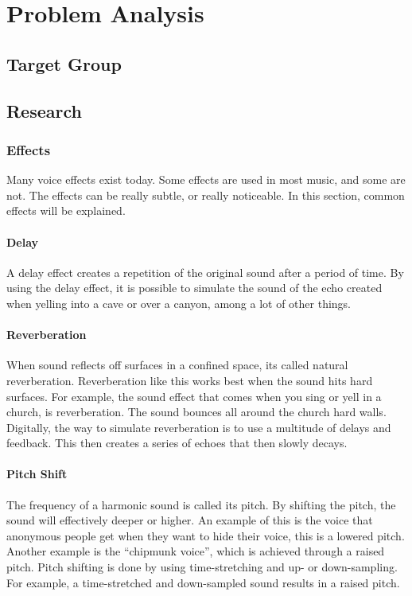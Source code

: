 \chapter{Problem Analysis}


\section{Target Group}


\section{Research}

\subsection{Effects}
Many voice effects exist today. Some effects are used in most music, and some are not. The effects can be really subtle, or really noticeable.
In this section, common effects will be explained.


\subsubsection{Delay}

A delay effect creates a repetition of the original sound after a period of time\citep{Loeffler_2014}. By using the delay effect, it is possible to simulate the sound of the echo created when yelling into a cave or over a canyon, among a lot of other things.

\subsubsection{Reverberation}

When sound reflects off surfaces in a confined space, its called natural reverberation\citep{Redmon_1997}. Reverberation like this works best when the sound hits hard surfaces. For example, the sound effect that comes when you sing or yell in a church, is reverberation. The sound bounces all around the church hard walls.
Digitally, the way to simulate reverberation is to use a multitude of delays and feedback. This then creates a series of echoes that then slowly decays.

\subsubsection{Pitch Shift}

The frequency of a harmonic sound is called its pitch\citep{Katjaas_00}. By shifting the pitch, the sound will effectively deeper or higher. An example of this is the voice that anonymous people get when they want to hide their voice, this is a lowered pitch. Another example is the “chipmunk voice”, which is achieved through a raised pitch.
Pitch shifting is done by using time-stretching and up- or down-sampling. For example, a time-stretched and down-sampled sound results in a raised pitch.\\

